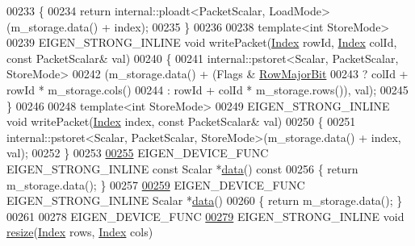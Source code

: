 \begin{DoxyCode}
00233 \textcolor{keyword}{    }\{
00234       \textcolor{keywordflow}{return} internal::ploadt<PacketScalar, LoadMode>(m\_storage.data() + index);
00235     \}
00236 
00238     \textcolor{keyword}{template}<\textcolor{keywordtype}{int} StoreMode>
00239     EIGEN\_STRONG\_INLINE \textcolor{keywordtype}{void} writePacket(\hyperlink{namespace_eigen_a62e77e0933482dafde8fe197d9a2cfde}{Index} rowId, \hyperlink{namespace_eigen_a62e77e0933482dafde8fe197d9a2cfde}{Index} colId, \textcolor{keyword}{const} PacketScalar& val)
00240     \{
00241       internal::pstoret<Scalar, PacketScalar, StoreMode>
00242               (m\_storage.data() + (Flags & \hyperlink{group__flags_gae4f56c2a60bbe4bd2e44c5b19cbe8762}{RowMajorBit}
00243                                    ? colId + rowId * m\_storage.cols()
00244                                    : rowId + colId * m\_storage.rows()), val);
00245     \}
00246 
00248     \textcolor{keyword}{template}<\textcolor{keywordtype}{int} StoreMode>
00249     EIGEN\_STRONG\_INLINE \textcolor{keywordtype}{void} writePacket(\hyperlink{namespace_eigen_a62e77e0933482dafde8fe197d9a2cfde}{Index} index, \textcolor{keyword}{const} PacketScalar& val)
00250     \{
00251       internal::pstoret<Scalar, PacketScalar, StoreMode>(m\_storage.data() + index, val);
00252     \}
00253 
\hyperlink{class_eigen_1_1_plain_object_base_ac25699535374b1854cf8494e44ad31b2}{00255}     EIGEN\_DEVICE\_FUNC EIGEN\_STRONG\_INLINE \textcolor{keyword}{const} Scalar *\hyperlink{class_eigen_1_1_plain_object_base_ac25699535374b1854cf8494e44ad31b2}{data}()\textcolor{keyword}{ const}
00256 \textcolor{keyword}{    }\{ \textcolor{keywordflow}{return} m\_storage.data(); \}
00257 
\hyperlink{class_eigen_1_1_plain_object_base_a54ed64f45b2f5e852355d5e2311810bd}{00259}     EIGEN\_DEVICE\_FUNC EIGEN\_STRONG\_INLINE Scalar *\hyperlink{class_eigen_1_1_plain_object_base_a54ed64f45b2f5e852355d5e2311810bd}{data}()
00260     \{ \textcolor{keywordflow}{return} m\_storage.data(); \}
00261 
00278     EIGEN\_DEVICE\_FUNC
\hyperlink{class_eigen_1_1_plain_object_base_a99d9054ee2d5a40c6e00ded0265e9cea}{00279}     EIGEN\_STRONG\_INLINE \textcolor{keywordtype}{void} \hyperlink{class_eigen_1_1_plain_object_base_a99d9054ee2d5a40c6e00ded0265e9cea}{resize}(\hyperlink{namespace_eigen_a62e77e0933482dafde8fe197d9a2cfde}{Index} rows, \hyperlink{namespace_eigen_a62e77e0933482dafde8fe197d9a2cfde}{Index} cols)

\end{DoxyCode}
